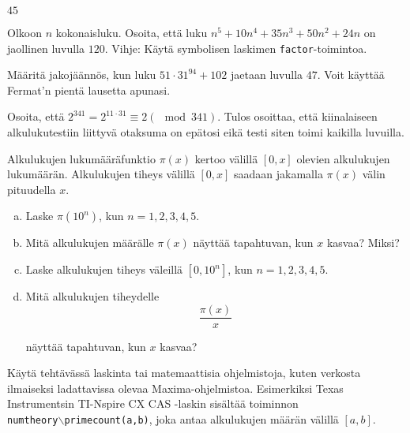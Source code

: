 \begin{kotitehtavasivu}
\begin{tehtava}
    \begin{vastaus}
        $45$
    \end{vastaus}
    
\end{tehtava}

\begin{tehtava}
    Olkoon $n$ kokonaisluku. Osoita, että luku $n^5+10n^4+35n^3+50n^2+24n$ on jaollinen luvulla $120$. Vihje: Käytä symbolisen laskimen {\tt factor}-toimintoa.
\end{tehtava}


\begin{tehtava}
    Määritä jakojäännös, kun luku $51\cdot 31^{94}+102$ jaetaan
    luvulla $47$. Voit käyttää Fermat'n pientä lausetta apunasi.
\end{tehtava}

\begin{tehtava}
    Osoita, että $2^{341} = 2^{11 \cdot 31} \equiv 2 (\mod 341)
    $. Tulos osoittaa, että kiinalaiseen alkulukutestiin liittyvä
    otaksuma on epätosi eikä testi siten toimi kaikilla luvuilla.
\end{tehtava}

\begin{tehtava}
    Alkulukujen lukumääräfunktio $\pi(x)$ kertoo välillä $[0, x]$
    olevien alkulukujen lukumäärän. Alkulukujen tiheys välillä $[0, x]
    $ saadaan jakamalla $\pi(x)$ välin pituudella $x$.
    \begin{enumerate}[a)]
    \item Laske $\pi(10^n)$, kun $n=1, 2, 3, 4, 5$.
    \item Mitä alkulukujen määrälle $\pi(x)$ näyttää tapahtuvan,
    kun $x$ kasvaa? Miksi?
    \item Laske alkulukujen tiheys väleillä $[0, 10^n]$, kun
    $n=1, 2, 3, 4, 5$.
    \item Mitä alkulukujen tiheydelle
    \[
    \frac{\pi(x)}{x}
    \]

    näyttää tapahtuvan, kun $x$ kasvaa?
    \end{enumerate}
    Käytä tehtävässä laskinta tai matemaattisia ohjelmistoja, kuten
    verkosta ilmaiseksi ladattavissa olevaa Maxima-ohjelmistoa.
    Esimerkiksi Texas Instrumentsin TI-Nspire CX CAS -laskin sisältää
    toiminnon \\{\tt numtheory$\backslash$primecount(a,b)}, joka antaa
    alkulukujen määrän välillä $[a, b]$.
\end{tehtava}


\end{kotitehtavasivu}
